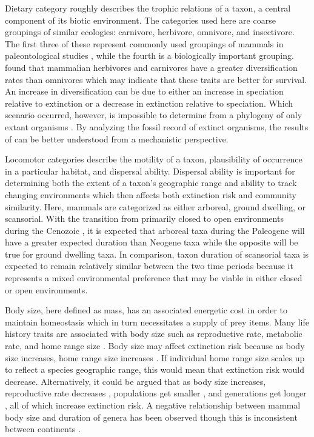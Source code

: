 \documentclass[12pt,letterpaper]{article}
\begin{document}
Dietary category roughly describes the trophic relations of a taxon, a central component of its biotic environment. The categories used here are coarse groupings of similar ecologies: carnivore, herbivore, omnivore, and insectivore. The first three of these represent commonly used groupings of mammals in paleontological studies \citep{Jernvall2004,Price2012}, while the fourth is a biologically important grouping. \citet{Price2012} found that mammalian herbivores and carnivores have a greater diversification rates than omnivores which may indicate that these traits are better for survival. An increase in diversification can be due to either an increase in speciation relative to extinction or a decrease in extinction relative to speciation. Which scenario occurred, however, is impossible to determine from a phylogeny of only extant organisms \citep{Rabosky2010a}. By analyzing the fossil record of extinct organisms, the results of \citet{Price2012} can be better understood from a mechanistic perspective.

Locomotor categories describe the motility of a taxon, plausibility of occurrence in a particular habitat, and dispersal ability. Dispersal ability is important for determining both the extent of a taxon's geographic range and ability to track changing environments \citep{Birand2012,Jablonski2006a,Gaston2009} which then affects both extinction risk and community similarity. Here, mammals are categorized as either arboreal, ground dwelling, or scansorial. With the transition from primarily closed to open environments during the Cenozoic \citep{Blois2009,Janis1993a,Stromberg2005,Stromberg2013}, it is expected that arboreal taxa during the Paleogene will have a greater expected duration than Neogene taxa while the opposite will be true for ground dwelling taxa. In comparison, taxon duration of scansorial taxa is expected to remain relatively similar between the two time periods because it represents a mixed environmental preference that may be viable in either closed or open environments. 

Body size, here defined as mass, has an associated energetic cost in order to maintain homeostasis which in turn necessitates a supply of prey items. Many life history traits are associated with body size such as reproductive rate, metabolic rate, and home range size \cite{Peters1983a,Damuth1979,Brown1987,Smith2004}. Body size may affect extinction risk because as body size increases, home range size increases \citep{Damuth1979}. If individual home range size scales up to reflect a species geographic range, this would mean that extinction risk would decrease. Alternatively, it could be argued that as body size increases, reproductive rate decreases \citep{Johnson2002b}, populations get smaller \citep{White2007}, and generations get longer \citep{Martin1993a}, all of which increase extinction risk. A negative relationship between mammal body size and duration of genera has been observed \citep{Liow2008,Davidson2012} though this is inconsistent between continents \citep{Tomiya2013,Liow2008}. 
\end{document}
